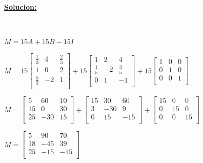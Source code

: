 \documentclass[11pt, conference]{IEEEtran}
\begin{document}
{\begin{enumerate}
    \ 
	
    {\bf \underline{Solucion:}}
    
    \
    
    $M = 15A+15B-15I$
    
    $
      M = 15 \left[
      \begin{array}{ccc}
      \frac{1}{3} & 4 & \frac{2}{3} \\
      1 & 0 & 2 \\
      \frac{5}{3} & -2 & 1 \\
      \end{array}
      \right]
      + 15 \left[
      \begin{array}{ccc}
      1 & 2 & 4 \\
      \frac{1}{5} & -2 & \frac{3}{5} \\
      0 & 1 & -1 \\
      \end{array}
      \right]
      +15 \left[
      \begin{array}{ccc}
      1 & 0 & 0 \\
      0 & 1 & 0 \\
      0 & 0 & 1 \\
      \end{array}
      \right]
    $
    
    $
      M = \left[
      \begin{array}{ccc}
      5 & 60 & 10 \\
      15 & 0 & 30 \\
      25 & -30 & 15 \\
      \end{array}
      \right]
      + \left[
      \begin{array}{ccc}
      15 & 30 & 60 \\
      3 & -30 & 9 \\
      0 & 15 & -15 \\
      \end{array}
      \right]
      + \left[
      \begin{array}{ccc}
      15 & 0 & 0 \\
      0 & 15 & 0 \\
      0 & 0 & 15 \\
      \end{array}
      \right]
    $
    
    $
      M = \left[
      \begin{array}{ccc}
      5 & 90 & 70 \\
      18 & -45 & 39 \\
      25 & -15 & -15 \\
      \end{array}
      \right]
    $
\end{enumerate}
}
\end{document}
